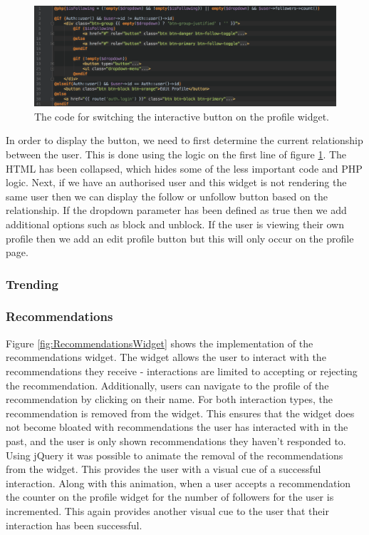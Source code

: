\begin{figure}[H]
	\centering
	\includegraphics[width=\textwidth]{Images/Implementation/UI/Widgets/Profile_Follow}
	\caption{The code for switching the interactive button on the profile widget.}
	\label{fig:Profile_Follow}
\end{figure}

In order to display the button, we need to first determine the current relationship between the user. This is done using the logic on the first line of figure \ref{fig:Profile_Follow}. The HTML has been collapsed, which hides some of the less important code and PHP logic. Next, if we have an authorised user and this widget is not rendering the same user then we can display the follow or unfollow button based on the relationship. If the dropdown parameter has been defined as true then we add additional options such as block and unblock. If the user is viewing their own profile then we add an edit profile button but this will only occur on the profile page.

\subsubsection{Trending}
\subsubsection{Recommendations}
Figure \ref{fig:RecommendationsWidget} shows the implementation of the recommendations widget. The widget allows the user to interact with the recommendations they receive - interactions are limited to accepting or rejecting the recommendation. Additionally, users can navigate to the profile of the recommendation by clicking on their name. For both interaction types, the recommendation is removed from the widget. This ensures that the widget does not become bloated with recommendations the user has interacted with in the past, and the user is only shown recommendations they haven't responded to. Using jQuery it was possible to animate the removal of the recommendations from the widget. This provides the user with a visual cue of a successful interaction. Along with this animation, when a user accepts a recommendation the counter on the profile widget for the number of followers for the user is incremented. This again provides another visual cue to the user that their  interaction has been successful.

